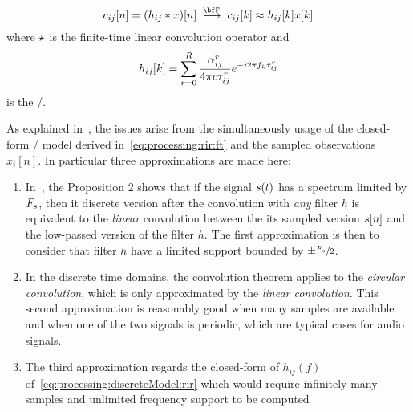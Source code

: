 \begin{equation}
    c_{ij}[n] = (h_{ij} \conv x)[n]
    \;\overset{\discreteFT{}}{\kto}\;
    c_{ij}[k] \approx h_{ij}[k] x[k]
\end{equation}
where $\star$ is the finite-time linear convolution operator and
    \begin{equation}\label{eq:processing:discreteModel:rir}
        h_{ij}[ k] = \sum_{r=0}^{R}
                    \frac{\alpha_{ij}^r}{4 \pi c \tau_{ij}^r}
                    {e}^{- {i} 2 \pi f_k \tau_{ij}^r}
    \end{equation}
is the \RIR/.

As explained in~, the issues arise from the simultaneously usage of the closed-form \RIR/ model derived in~\cref{eq:processing:rir:ft}
and the sampled observations $x_i[n]$. In particular three approximations are made here:

\begin{enumerate}
    \item\label{en:processing:dft:1}
    In~, the Proposition 2 shows that if the signal $s(t)$ has a spectrum limited by $F_s$, then it discrete version after the convolution with \textit{any} filter $h$
    is equivalent to the \textit{linear} convolution between the its sampled version $s[n]$ and the low-passed version of the filter $h$.
    The first approximation is then to consider that filter $h$ have a limited support bounded by $\pm \sfrac{F_s}{2}$.
    \item\label{en:processing:dft:2}
    In the discrete time domains, the convolution theorem applies to the \textit{circular convolution}, which is only approximated by the \textit{linear convolution}.
    This second approximation is reasonably good when many samples are available and when one of the two signals is periodic, which
    are typical cases for audio signals.
    \item\label{en:processing:dft:3}
    The third approximation regards the closed-form of $h_{ij}(f)$ of~\cref{eq:processing:discreteModel:rir} which
    would require infinitely many samples and unlimited frequency support to be computed
\end{enumerate}

